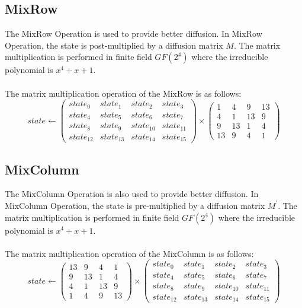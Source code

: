\documentclass[preprint]{transcrypto}
\begin{document}
\subsection{MixRow}
The MixRow Operation is used to provide better diffusion. In MixRow Operation, the state is post-multiplied by a diffusion matrix $M$. The matrix multiplication is performed in finite field $GF(2^4)$ where the irreducible polynomial is $x^4 + x+ 1$.\\\\
The matrix multiplication operation of the MixRow is as follows:\\
\begin{equation}
state \leftarrow 
\begin{pmatrix}
state_0 & state_1 & state_2 & state_3 \\
state_4 & state_5 & state_6 & state_7 \\
state_8 & state_{9} & state_{10} & state_{11} \\
state_{12} & state_{13} & state_{14} & state_{15}
\end{pmatrix}
\times
\begin{pmatrix}
1 & 4 & 9 & 13\\
4 & 1 & 13 & 9\\
9 & 13 & 1 & 4\\
13 & 9 & 4 & 1
\end{pmatrix}
\end{equation}



\subsection{MixColumn}
The MixColumn Operation is also used to provide better diffusion. In MixColumn Operation, the state is pre-multiplied by a diffusion matrix $M^'$. The matrix multiplication is performed in finite field $GF(2^4)$ where the irreducible polynomial is $x^4 + x+ 1$.\\\\
The matrix multiplication operation of the MixColumn is as follows:\\
\begin{equation}
state \leftarrow 
\begin{pmatrix}
13 & 9 & 4 & 1\\
9 & 13 & 1 & 4\\
4 & 1 & 13 & 9\\
1 & 4 & 9 & 13
\end{pmatrix}
\times
\begin{pmatrix}
state_0 & state_1 & state_2 & state_3 \\
state_4 & state_5 & state_6 & state_7 \\
state_8 & state_{9} & state_{10} & state_{11} \\
state_{12} & state_{13} & state_{14} & state_{15}
\end{pmatrix}
\end{equation}
\end{document}
